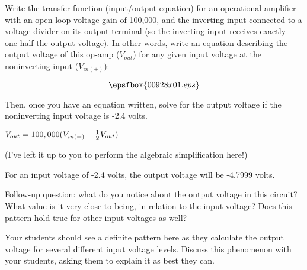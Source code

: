 

Write the transfer function (input/output equation) for an operational amplifier with an open-loop voltage gain of 100,000, and the inverting input connected to a voltage divider on its output terminal (so the inverting input receives exactly one-half the output voltage).  In other words, write an equation describing the output voltage of this op-amp ($V_{out}$) for any given input voltage at the noninverting input ($V_{in(+)}$):

$$\epsfbox{00928x01.eps}$$

Then, once you have an equation written, solve for the output voltage if the noninverting input voltage is -2.4 volts.







$V_{out} = 100,000(V_{in(+)} - {1 \over 2}V_{out})$

\vskip 10pt

(I've left it up to you to perform the algebraic simplification here!)

\vskip 20pt

For an input voltage of -2.4 volts, the output voltage will be -4.7999 volts.

\vskip 10pt

Follow-up question: what do you notice about the output voltage in this circuit?  What value is it very close to being, in relation to the input voltage?  Does this pattern hold true for other input voltages as well?







Your students should see a definite pattern here as they calculate the output voltage for several different input voltage levels.  Discuss this phenomenon with your students, asking them to explain it as best they can.




